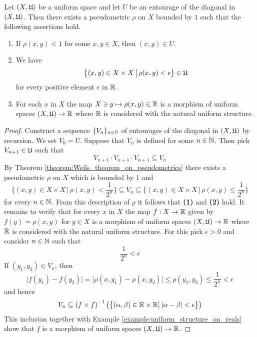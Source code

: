 \begin{theorem}\label{theorem:pseudometric_associated_to_entourage_is_uniform}
Let $(X,{\mathfrak U})$ be a uniform space and let $U$ be an entourage of the diagonal in $(X,{\mathfrak U})$. Then there exists a pseudometric $\rho$ on $X$ bounded by $1$ such that the following assertions hold.
\begin{enumerate}[label=\emph{\textbf{(\arabic*)}}, leftmargin=*]
\item If $\rho(x,y) < 1$ for some $x,y\in X$, then $(x,y)\in U$. 
\item We have
$$\big\{(x,y)\in X\times X\,\big|\,\rho(x,y) < \epsilon \big\}\in {\mathfrak U}$$
for every positive element $\epsilon$ in ${\mathbb R}$.
\item For each $x$ in $X$ the map $X\ni y \mapsto \rho(x,y)\in {\mathbb R}$ is a morphism of uniform spaces $\left(X,{\mathfrak U}\right) \rightarrow {\mathbb R}$ where ${\mathbb R}$ is considered with the natural uniform structure.
\end{enumerate}
\end{theorem}
\begin{proof}
Construct a sequence $\{V_n\}_{n\in {\mathbb N}}$ of entourages of the diagonal in $\left(X,{\mathfrak U}\right)$ by recursion. We set $V_0 = U$. Suppose that $V_n$ is defined for some $n\in {\mathbb N}$. Then pick $V_{n+1}\in {\mathfrak U}$ such that 
$$V_{n+1}\cdot V_{n+1}\cdot V_{n+1} \subseteq V_n$$
By Theorem \ref{theorem:Weils_theorem_on_pseudometrics} there exists a pseudometric $\rho$ on $X$ which is bounded by $1$ and
$$\bigg\{(x,y)\in X\times X\,\bigg|\,\rho(x,y)<\frac{1}{2^n}\bigg\} \subseteq V_n \subseteq \bigg\{(x,y)\in X\times X\,\bigg|\,\rho(x,y) \leq \frac{1}{2^n}\bigg\}$$
for every $n\in {\mathbb N}$. From this description of $\rho$ it follows that \textbf{(1)} and \textbf{(2)} hold. It remains to verify that for every $x$ in $X$ the map $f:X\rightarrow {\mathbb R}$ given by $f(y) = \rho(x,y)$ for $y\in X$ is a morphism of uniform spaces $\left(X,{\mathfrak U}\right) \rightarrow {\mathbb R}$ where ${\mathbb R}$ is considered with the natural uniform structure. For this pick $\epsilon > 0$ and consider $n\in {\mathbb N}$ such that 
$$\frac{1}{2^n} < \epsilon$$
If $(y_1,y_2) \in V_n$, then
$$\big|f(y_1) - f(y_2)\big| = \big|\rho(x,y_1) - \rho(x,y_2)\big|\leq \rho(y_1,y_2) \leq \frac{1}{2^n}  < \epsilon$$
and hence 
$$V_n \subseteq \left(f\times f\right)^{-1}\left(\big\{(\alpha, \beta)\in {\mathbb R}\times {\mathbb R}\big|\,|\alpha - \beta| < \epsilon\big\}\right)$$
This inclusion together with Example \ref{example:uniform_structure_on_reals} show that $f$ is a morphism of uniform spaces $\left(X,{\mathfrak U}\right) \rightarrow {\mathbb R}$.
\end{proof}

